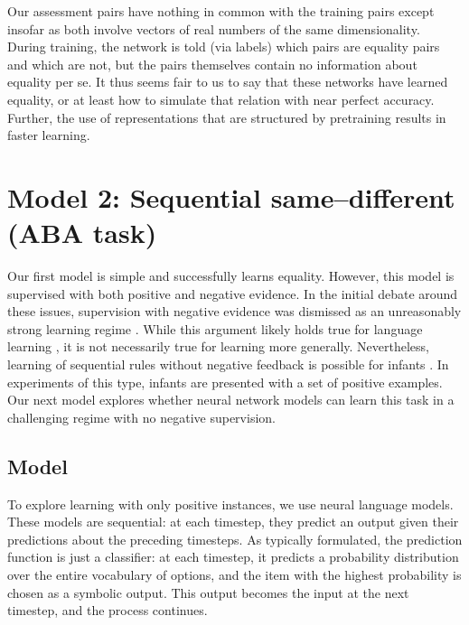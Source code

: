 \documentclass{article}
\renewcommand{\cite}{\citep}
\begin{document}
Our assessment pairs have nothing in common with the training pairs except insofar as both involve vectors of real numbers of the same dimensionality. During training, the network is told (via labels) which pairs are equality pairs and which are not, but the pairs themselves contain no information about equality per se. It thus seems fair to us to say that these networks have learned equality, or at least how to simulate that relation with near perfect accuracy. Further, the use of representations that are structured by pretraining results in faster learning.

\section{Model 2: Sequential same--different (ABA task)}\label{sec:lms}

Our first model is simple and successfully learns equality. However, this model is supervised with both positive and negative evidence. In the initial debate around these issues, supervision with negative evidence was dismissed as an unreasonably strong learning regime \citep[e.g.,][]{marcus:1999a}. While this argument likely holds true for language learning \citep[in which supervision is generally agreed not to be binary or direct;][]{brown:1970,chouinard2003}, it is not necessarily true for learning more generally. Nevertheless, learning of sequential rules without negative feedback is possible for infants \cite{marcus:1999,rabagliati:2019}. In experiments of this type, infants are presented with a set of positive examples. Our next model explores whether neural network models can learn this task in a challenging regime with no negative supervision.

\subsection{Model}

To explore learning with only positive instances, we use neural language models. These models are sequential: at each timestep, they predict an output given their predictions about the preceding timesteps. As typically formulated, the prediction function is just a classifier: at each timestep, it predicts a probability distribution over the entire vocabulary of options, and the item with the highest probability is chosen as a symbolic output. This output becomes the input at the next timestep, and the process continues.
\end{document}
